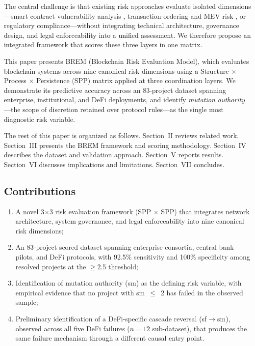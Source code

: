 \documentclass[conference]{IEEEtran}
\begin{document}
The central challenge is that existing risk approaches evaluate isolated dimensions---smart contract vulnerability analysis \cite{atzei2017}, transaction-ordering and MEV risk \cite{daian2020}, or regulatory compliance---without integrating technical architecture, governance design, and legal enforceability into a unified assessment. We therefore propose an integrated framework that scores these three layers in one matrix.

This paper presents BREM (Blockchain Risk Evaluation Model), which evaluates blockchain systems across nine canonical risk dimensions using a Structure $\times$ Process $\times$ Persistence (SPP) matrix applied at three coordination layers. We demonstrate its predictive accuracy across an 83-project dataset spanning enterprise, institutional, and DeFi deployments, and identify \textit{mutation authority}---the scope of discretion retained over protocol rules---as the single most diagnostic risk variable.

The rest of this paper is organized as follows. Section~II reviews related work. Section~III presents the BREM framework and scoring methodology. Section~IV describes the dataset and validation approach. Section~V reports results. Section~VI discusses implications and limitations. Section~VII concludes.

\subsection{Contributions}

\begin{enumerate}
    \item A novel 3$\times$3 risk evaluation framework (SPP $\times$ SPP) that integrates network architecture, system governance, and legal enforceability into nine canonical risk dimensions;
    \item An 83-project scored dataset spanning enterprise consortia, central bank pilots, and DeFi protocols, with 92.5\% sensitivity and 100\% specificity among resolved projects at the $\geq$2.5 threshold;
    \item Identification of mutation authority (sm) as the defining risk variable, with empirical evidence that no project with sm~$\leq$~2 has failed in the observed sample;
    \item Preliminary identification of a DeFi-specific cascade reversal (sf$\rightarrow$sm), observed across all five DeFi failures ($n=12$ sub-dataset), that produces the same failure mechanism through a different causal entry point.
\end{enumerate}
\end{document}
